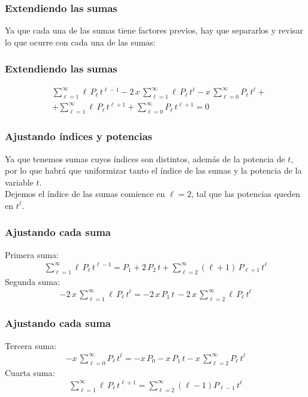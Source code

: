 \begin{frame}
\frametitle{Extendiendo las sumas}
Ya que cada una de las sumas tiene factores previos, hay que separarlos y revisar lo que ocurre con cada una de las sumas:
\end{frame}
\begin{frame}
\frametitle{Extendiendo las sumas}
\begin{align*}
&\sum_{\ell=1}^{\infty} \ell \, P_{\ell} \, t^{\ell-1} - 2 \, x \, \sum_{\ell=1}^{\infty} \ell \, P_{\ell} \, t^{\ell} - x \, \sum_{\ell=0}^{\infty} P_{\ell} \, t^{\ell} + \\[0.5em]
&+ \sum_{\ell=1}^{\infty} \ell \, P_{\ell} \, t^{\ell+1} + \sum_{\ell=0}^{\infty} P_{\ell} \, t^{\ell+1} = 0
\end{align*}
\end{frame}
\begin{frame}
\frametitle{Ajustando índices y potencias}
Ya que tenemos sumas cuyos índices son distintos, además de la potencia de $t$, por lo que habrá que uniformizar tanto el índice de las sumas y la potencia de la variable $t$.
\\
\bigskip
\pause
Dejemos el índice de las sumas comience en $\ell = 2$, tal que las potencias queden en $t^{\ell}$. 
\end{frame}
\begin{frame}
\frametitle{Ajustando cada suma}
Primera suma:
\begin{align*}
\sum_{\ell=1}^{\infty} \ell \, P_{\ell} \, t^{\ell-1} = P_{1} +  2 \, P_{2} \, t + \sum_{\ell=2}^{\infty} (\ell + 1) \, P_{\ell+1} \, t^{\ell}
\end{align*}
\pause
Segunda suma:
\begin{align*}
- 2 \, x \, \sum_{\ell=1}^{\infty} \ell \, P_{\ell} \, t^{\ell} = - 2 \, x \, P_{1} \, t \, - 2 \, x \, \sum_{\ell=2}^{\infty} \ell \, P_{\ell} \, t^{\ell}
\end{align*}
\end{frame}
\begin{frame}
\frametitle{Ajustando cada suma}
Tercera suma:
\begin{align*}
- x \, \sum_{\ell=0}^{\infty} P_{\ell} \, t^{\ell} = - x \, P_{0} - x \, P_{1} \, t - x \, \sum_{\ell=2}^{\infty} P_{\ell} \, t^{\ell}
\end{align*}
\pause
Cuarta suma:
\begin{align*}
\sum_{\ell=1}^{\infty} \ell \, P_{\ell} \, t^{\ell+1} = \sum_{\ell=2}^{\infty} (\ell - 1) P_{\ell-1} \, t^{\ell}
\end{align*}
\end{frame}
